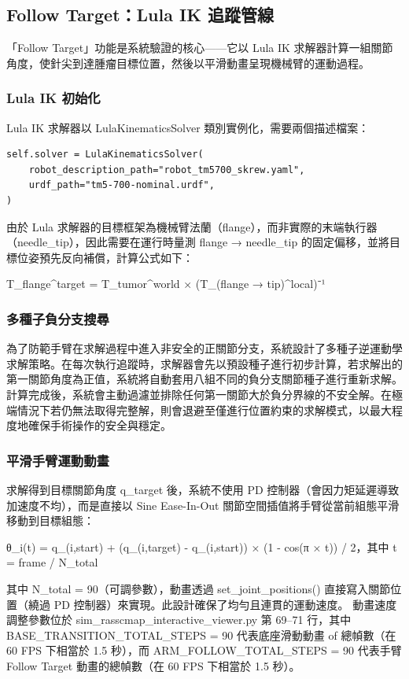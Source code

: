 \documentclass[a4paper, 12pt]{article}
\begin{document}
\subsection{Follow Target：Lula IK 追蹤管線}
\label{subsec:lula_ik}

「Follow Target」功能是系統驗證的核心——它以 Lula IK 求解器計算一組關節角度，使針尖到達腫瘤目標位置，然後以平滑動畫呈現機械臂的運動過程。

\subsubsection{Lula IK 初始化}

Lula IK 求解器以 LulaKinematicsSolver 類別實例化，需要兩個描述檔案：
\begin{lstlisting}[caption={Lula IK 求解器初始化}]
self.solver = LulaKinematicsSolver(
    robot_description_path="robot_tm5700_skrew.yaml",
    urdf_path="tm5-700-nominal.urdf",
)
\end{lstlisting}
由於 Lula 求解器的目標框架為機械臂法蘭（flange），而非實際的末端執行器（needle\_tip），因此需要在運行時量測 flange → needle\_tip 的固定偏移，並將目標位姿預先反向補償，計算公式如下：
\begin{center}
T\_flange\^{}target = T\_tumor\^{}world × (T\_(flange → tip)\^{}local)⁻¹
\end{center}

\subsubsection{多種子負分支搜尋}

為了防範手臂在求解過程中進入非安全的正關節分支，系統設計了多種子逆運動學求解策略。在每次執行追蹤時，求解器會先以預設種子進行初步計算，若求解出的第一關節角度為正值，系統將自動套用八組不同的負分支關節種子進行重新求解。計算完成後，系統會主動過濾並排除任何第一關節大於負分界線的不安全解。在極端情況下若仍無法取得完整解，則會退避至僅進行位置約束的求解模式，以最大程度地確保手術操作的安全與穩定。

\subsubsection{平滑手臂運動動畫}

求解得到目標關節角度 q\_target 後，系統不使用 PD 控制器（會因力矩延遲導致加速度不均），而是直接以 Sine Ease-In-Out 關節空間插值將手臂從當前組態平滑移動到目標組態：
\begin{center}
θ\_i(t) = q\_(i,start) + (q\_(i,target) - q\_(i,start)) × (1 - cos(π × t)) / 2，其中 t = frame / N\_total
\end{center}
其中 N\_total = 90（可調參數），動畫透過 set\_joint\_positions() 直接寫入關節位置（繞過 PD 控制器）來實現。此設計確保了均勻且連貫的運動速度。
動畫速度調整參數位於 sim\_rasscmap\_interactive\_viewer.py 第 69--71 行，其中 BASE\_TRANSITION\_TOTAL\_STEPS = 90 代表底座滑動動畫 of 總幀數（在 60 FPS 下相當於 1.5 秒），而 ARM\_FOLLOW\_TOTAL\_STEPS = 90 代表手臂 Follow Target 動畫的總幀數（在 60 FPS 下相當於 1.5 秒）。
\end{document}
